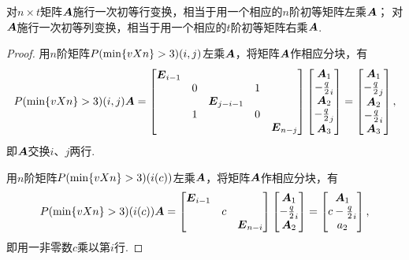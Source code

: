 \begin{property}\label{theorem:逆矩阵.初等矩阵的性质2}
对\(n \times t\)矩阵\(\A\)施行一次初等行变换，相当于用一个相应的\(n\)阶初等矩阵左乘\(\A\)；
对\(\A\)施行一次初等列变换，相当于用一个相应的\(t\)阶初等矩阵右乘\(\A\).
\begin{proof}
用\(n\)阶矩阵\(\P(i,j)\)左乘\(\A\)，将矩阵\(\A\)作相应分块，有\[
\P(i,j) \A = \begin{bmatrix}
\E_{i-1} \\
& 0 & & 1 \\
& & \E_{j-i-1} \\
& 1 & & 0 \\
& & & & \E_{n-j}
\end{bmatrix} \begin{bmatrix}
\A_1 \\ \a_i \\ \A_2 \\ \a_j \\ \A_3
\end{bmatrix} = \begin{bmatrix}
\A_1 \\ \a_j \\ \A_2 \\ \a_i \\ \A_3
\end{bmatrix},
\]即\(\A\)交换\(i\)、\(j\)两行.

用\(n\)阶矩阵\(\P(i(c))\)左乘\(\A\)，将矩阵\(\A\)作相应分块，有\[
\P(i(c)) \A = \begin{bmatrix}
\E_{i-1} \\
& c \\
& & \E_{n-i}
\end{bmatrix} \begin{bmatrix}
\A_1 \\ \a_i \\ \A_2
\end{bmatrix} = \begin{bmatrix}
\A_1 \\ c \a_i \\ a_2
\end{bmatrix},
\]即用一非零数\(c\)乘以第\(i\)行.


\end{proof}
\end{property}
